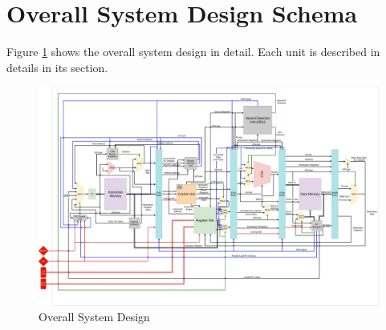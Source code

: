 \section{Overall System Design Schema}
Figure \ref{fig:overall} shows the overall system design in detail. Each unit is described in details in its section.

\begin{figure}[hp]
    \centering
    \includegraphics[width=\textwidth]{images/overall_system.png}
    \caption{Overall System Design}
    \label{fig:overall}
\end{figure}


